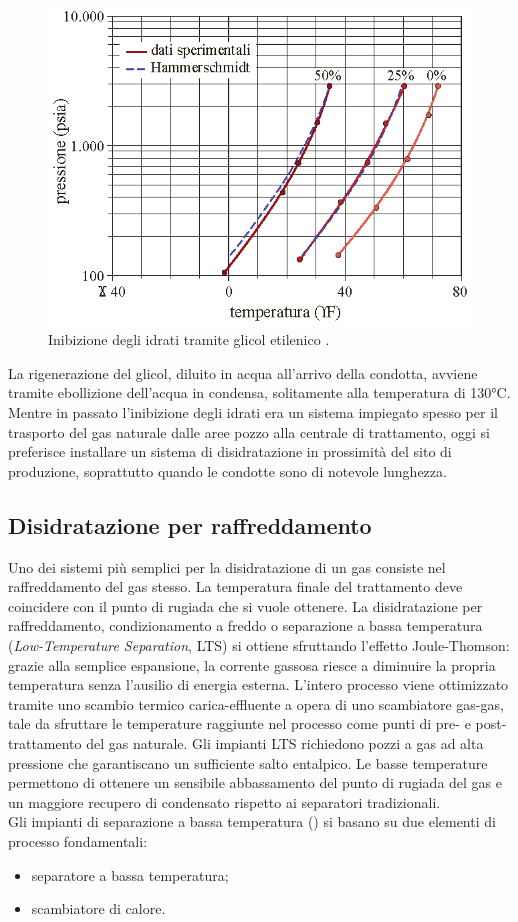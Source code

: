 \begin{figure}[htbp]
    \centering
    \includegraphics[width=.5\textwidth]{fig/impianti/inibizioneidrati.eps}
    \caption{Inibizione degli idrati tramite glicol etilenico \parencite{bianco2005impiantigas}.}
    \label{fig:inibizioneidrati}
\end{figure}

La rigenerazione del glicol, diluito in acqua all'arrivo della condotta, avviene tramite ebollizione dell'acqua in condensa, solitamente alla temperatura di 130°C.
Mentre in passato l'inibizione degli idrati era un sistema impiegato spesso per il trasporto del gas naturale dalle aree pozzo alla centrale di trattamento, oggi si preferisce installare un sistema di disidratazione in prossimità del sito di produzione, soprattutto quando le condotte sono di notevole lunghezza.

\subsection{Disidratazione per raffreddamento} \label{subsection:lts}
Uno dei sistemi più semplici per la disidratazione di un gas consiste nel raffreddamento del gas stesso. La temperatura finale del trattamento deve coincidere con il punto di rugiada che si vuole ottenere. La disidratazione per raffreddamento, condizionamento a freddo o separazione a bassa temperatura (\textit{Low-Temperature Separation}, LTS) si ottiene sfruttando l'effetto Joule-Thomson: grazie alla semplice espansione, la corrente gassosa riesce a diminuire la propria temperatura senza l'ausilio di energia esterna. L'intero processo viene ottimizzato tramite uno scambio termico carica-effluente a opera di uno scambiatore gas-gas, tale da sfruttare le temperature raggiunte nel processo come punti di pre- e post-trattamento del gas naturale. Gli impianti LTS richiedono pozzi a gas ad alta pressione che garantiscano un sufficiente salto entalpico. Le basse temperature permettono di ottenere un sensibile abbassamento del punto di rugiada del gas e un maggiore recupero di condensato rispetto ai separatori tradizionali. \\
Gli impianti di separazione a bassa temperatura () si basano su due elementi di processo fondamentali:
\begin{itemize}
    \item separatore a bassa temperatura;
    \item scambiatore di calore.
\end{itemize}

